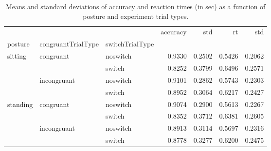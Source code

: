 \begin{table}
\centering
\caption{Means and standard deviations of accuracy and reaction times (in sec) as a function of posture and experiment trial types.}
\label{table-task-switching-replication-reaction-time}
\begin{tabular}{lllrrrr}
\toprule
         &             &        & accuracy &    std &     rt &    std \\
posture & congruantTrialType & switchTrialType &          &        &        &        \\
\midrule
sitting & congruant & noswitch &   0.9330 & 0.2502 & 0.5426 & 0.2062 \\
         &             & switch &   0.8252 & 0.3799 & 0.6496 & 0.2571 \\
         & incongruant & noswitch &   0.9101 & 0.2862 & 0.5743 & 0.2303 \\
         &             & switch &   0.8952 & 0.3064 & 0.6217 & 0.2427 \\
standing & congruant & noswitch &   0.9074 & 0.2900 & 0.5613 & 0.2267 \\
         &             & switch &   0.8352 & 0.3712 & 0.6381 & 0.2605 \\
         & incongruant & noswitch &   0.8913 & 0.3114 & 0.5697 & 0.2316 \\
         &             & switch &   0.8778 & 0.3277 & 0.6200 & 0.2475 \\
\bottomrule
\end{tabular}
\end{table}
